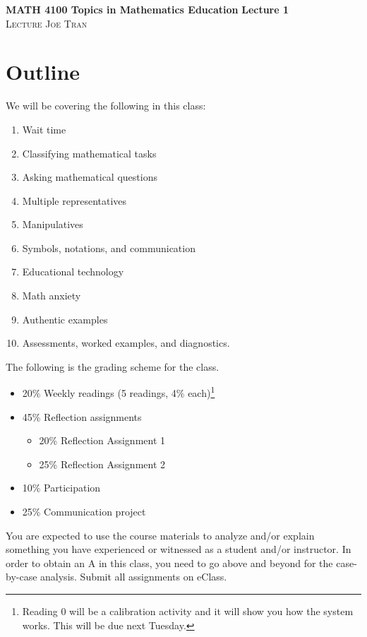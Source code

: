 \documentclass[11pt]{article}
\theoremstyle{theorem}\newtheorem*{task}{Task}
\theoremstyle{theorem}\newtheorem*{example}{Example}
\theoremstyle{definition}\newtheorem*{solution}{Solution}
\theoremstyle{theorem}\newtheorem*{prompt}{Prompt}
\begin{document}
\noindent \textbf{MATH 4100 Topics in Mathematics Education} \hfill \textbf{Lecture 1} \\
\textsc{Lecture} \hfill \textsc{Joe Tran}

\section{Outline}

We will be covering the following in this class:
\begin{enumerate}
    \item Wait time
    \item Classifying mathematical tasks
    \item Asking mathematical questions
    \item Multiple representatives
    \item Manipulatives
    \item Symbols, notations, and communication
    \item Educational technology
    \item Math anxiety
    \item Authentic examples
    \item Assessments, worked examples, and diagnostics.
\end{enumerate}

The following is the grading scheme for the class.
\begin{itemize}
    \item 20\% Weekly readings (5 readings, 4\% each)\footnote{Reading 0 will be a calibration activity and it will show you how the system works. This will be due next Tuesday.}
    \item 45\% Reflection assignments
    \begin{itemize}
        \item 20\% Reflection Assignment 1
        \item 25\% Reflection Assignment 2
    \end{itemize}
    \item 10\% Participation
    \item 25\% Communication project
\end{itemize}

You are expected to use the course materials to analyze and/or explain something you have experienced or witnessed as a student and/or instructor. In order to obtain an A in this class, you need to go above and beyond for the case-by-case analysis. Submit all assignments on eClass.
\end{document}
